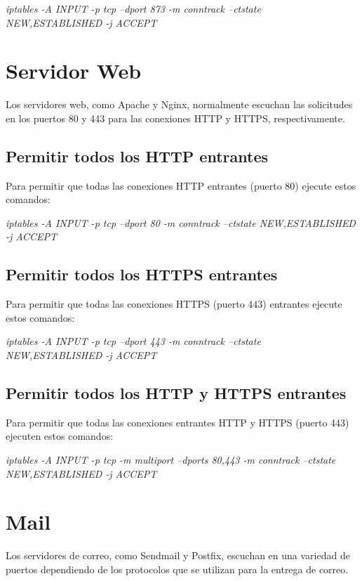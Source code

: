 \documentclass{article}
\begin{document}
\begin{center}
	\textit{ iptables -A INPUT -p tcp --dport 873 -m conntrack --ctstate NEW,ESTABLISHED -j ACCEPT}
\end{center}


\section*{Servidor Web}

Los servidores web, como Apache y Nginx, normalmente escuchan las solicitudes en los puertos 80 y 443 para las conexiones HTTP y HTTPS, respectivamente.

\subsection*{Permitir todos los HTTP entrantes}
Para permitir que todas las conexiones HTTP entrantes (puerto 80) ejecute estos comandos:

\begin{center}
	\textit{iptables -A INPUT -p tcp --dport 80 -m conntrack --ctstate NEW,ESTABLISHED -j ACCEPT}
\end{center}

\subsection*{Permitir todos los HTTPS entrantes}
Para permitir que todas las conexiones HTTPS (puerto 443) entrantes ejecute estos comandos:

\begin{center}
	\textit{ iptables -A INPUT -p tcp --dport 443 -m conntrack --ctstate NEW,ESTABLISHED -j ACCEPT}
\end{center}

\subsection*{Permitir todos los HTTP y HTTPS entrantes}
Para permitir que todas las conexiones entrantes HTTP y HTTPS (puerto 443) ejecuten estos comandos:

\begin{center}
	\textit{ iptables -A INPUT -p tcp -m multiport --dports 80,443 -m conntrack --ctstate NEW,ESTABLISHED -j ACCEPT}
\end{center}

\section*{Mail}
Los servidores de correo, como Sendmail y Postfix, escuchan en una variedad de puertos dependiendo de los protocolos que se utilizan para la entrega de correo. 
\end{document}
